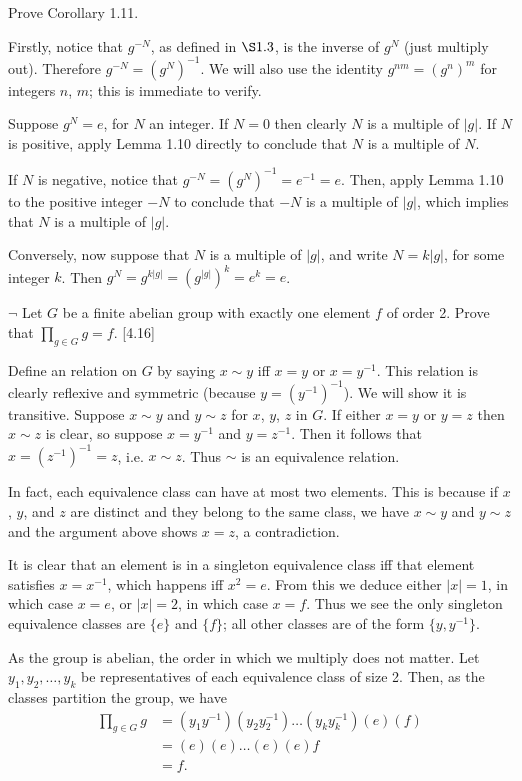 \begin{exercise}
	Prove Corollary 1.11.
\end{exercise}
\begin{solution}
	Firstly, notice that $g^{-N}$, as defined in $\S 1.3$, is the inverse of $g^N$ (just multiply out). Therefore $g^{-N} = (g^N)^{-1}$. We will also use the identity $g^{nm} = (g^n)^m$ for integers $n$, $m$; this is immediate to verify.
	
	Suppose $g^N = e$, for $N$ an integer. If $N = 0$ then clearly $N$ is a multiple of $|g|$. If $N$ is positive, apply Lemma 1.10 directly to conclude that $N$ is a multiple of $N$.
	
	If $N$ is negative, notice that $g^{-N} = (g^N)^{-1} = e^{-1} = e$. Then, apply Lemma 1.10 to the positive integer $-N$ to conclude that $-N$ is a multiple of $|g|$, which implies that $N$ is a multiple of $|g|$.
	
	Conversely, now suppose that $N$ is a multiple of $|g|$, and write $N = k|g|$, for some integer $k$. Then $g^N = g^{k|g|} = (g^{|g|})^k = e^k = e$. 
\end{solution}

\begin{exercise}
	$\neg$ Let $G$ be a finite abelian group with exactly one element $f$ of order 2. Prove that $\prod_{g\in G}g = f$. [4.16]
\end{exercise}
\begin{solution}
	Define an relation on $G$ by saying $x\sim y$ iff $x = y$ or $x = y^{-1}$. This relation is clearly reflexive and symmetric (because $y =(y^{-1})^{-1} $). We will show it is transitive. Suppose $x \sim y$ and $y\sim z$ for $x$, $y$, $z$ in $G$. If either $x = y$ or $y = z$ then $x\sim z$ is clear, so suppose $x = y^{-1}$ and $y = z^{-1}$. Then it follows that $x = (z^{-1})^{-1} = z$, i.e. $x\sim z$. Thus $\sim$ is an equivalence relation.
	
	In fact, each equivalence class can have at most two elements. This is because if $x$, $y$, and $z$ are distinct and they belong to the same class, we have $x\sim y$ and $y\sim z$ and the argument above shows $x= z$, a contradiction.
	
	It is clear that an element is in a singleton equivalence class iff that element satisfies $x = x^{-1}$, which happens iff $x^2 = e$. From this we deduce either $|x| = 1$, in which case $x = e$, or $|x| = 2$, in which case $x = f$. Thus we see the only singleton equivalence classes are $\{e\}$ and $\{f\}$; all other classes are of the form $\{y,y^{-1}\}$.
	
	As the group is abelian, the order in which we multiply does not matter. Let $y_1,y_2, \ldots, y_k$ be representatives of each equivalence class of size 2. Then, as the classes partition the group, we have
	\begin{align*}
		\prod_{g\in G}g &= (y_1y^{-1})(y_2y_2^{-1})\ldots(y_ky_k^{-1})(e)(f)\\
		&= (e)(e)\ldots (e)(e)f\\
		&=f.
	\end{align*}
\end{solution} 

